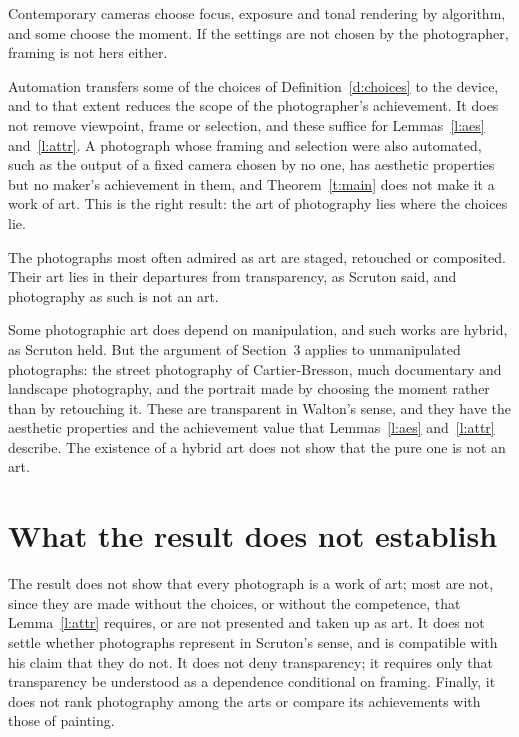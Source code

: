 \documentclass{situationist-preprint}
\begin{document}
\begin{objection}[Automation]\label{o:auto}
Contemporary cameras choose focus, exposure and tonal rendering by algorithm, and some choose the moment. If the settings are not chosen by the photographer, framing is not hers either.
\end{objection}

\begin{reply}
Automation transfers some of the choices of Definition~\ref{d:choices} to the device, and to that extent reduces the scope of the photographer's achievement. It does not remove viewpoint, frame or selection, and these suffice for Lemmas~\ref{l:aes} and~\ref{l:attr}. A photograph whose framing and selection were also automated, such as the output of a fixed camera chosen by no one, has aesthetic properties but no maker's achievement in them, and Theorem~\ref{t:main} does not make it a work of art. This is the right result: the art of photography lies where the choices lie.
\end{reply}

\begin{objection}[Manipulation]\label{o:manip}
The photographs most often admired as art are staged, retouched or composited. Their art lies in their departures from transparency, as Scruton said, and photography as such is not an art.
\end{objection}

\begin{reply}
Some photographic art does depend on manipulation, and such works are hybrid, as Scruton held. But the argument of Section~3 applies to unmanipulated photographs: the street photography of Cartier-Bresson, much documentary and landscape photography, and the portrait made by choosing the moment rather than by retouching it. These are transparent in Walton's sense, and they have the aesthetic properties and the achievement value that Lemmas~\ref{l:aes} and~\ref{l:attr} describe. The existence of a hybrid art does not show that the pure one is not an art.
\end{reply}

\section{What the result does not establish}

The result does not show that every photograph is a work of art; most are not, since they are made without the choices, or without the competence, that Lemma~\ref{l:attr} requires, or are not presented and taken up as art. It does not settle whether photographs represent in Scruton's sense, and is compatible with his claim that they do not. It does not deny transparency; it requires only that transparency be understood as a dependence conditional on framing. Finally, it does not rank photography among the arts or compare its achievements with those of painting.
\end{document}
